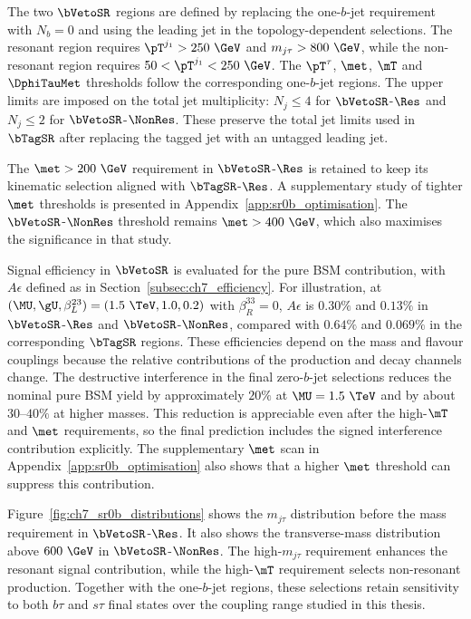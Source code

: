 The two $\bVetoSR$ regions are defined by replacing the one-$b$-jet requirement with $N_b=0$ and using the leading jet in the topology-dependent selections.
The resonant region requires $\pT^{j_1}>250~\GeV$ and $m_{j\tau}>800~\GeV$, while the non-resonant region requires $50<\pT^{j_1}<250~\GeV$.
The $\pT^\tau$, $\met$, $\mT$ and $\DphiTauMet$ thresholds follow the corresponding one-$b$-jet regions.
The upper limits are imposed on the total jet multiplicity: $N_j\leq4$ for $\bVetoSR$-$\Res$ and $N_j\leq2$ for $\bVetoSR$-$\NonRes$.
These preserve the total jet limits used in $\bTagSR$ after replacing the tagged jet with an untagged leading jet.

The $\met>200~\GeV$ requirement in $\bVetoSR$-$\Res$ is retained to keep its kinematic selection aligned with $\bTagSR$-$\Res$.
A supplementary study of tighter $\met$ thresholds is presented in Appendix~\ref{app:sr0b_optimisation}.
The $\bVetoSR$-$\NonRes$ threshold remains $\met>400~\GeV$, which also maximises the significance in that study.

Signal efficiency in $\bVetoSR$ is evaluated for the pure BSM contribution, with $A\epsilon$ defined as in Section~\ref{subsec:ch7_efficiency}.
For illustration, at $(\MU,\gU,\beta_L^{23})=(1.5~\TeV,1.0,0.2)$ with $\beta_R^{33}=0$, $A\epsilon$ is $0.30\%$ and $0.13\%$ in $\bVetoSR$-$\Res$ and $\bVetoSR$-$\NonRes$, compared with $0.64\%$ and $0.069\%$ in the corresponding $\bTagSR$ regions.
These efficiencies depend on the mass and flavour couplings because the relative contributions of the production and decay channels change.
The destructive interference in the final zero-$b$-jet selections reduces the nominal pure BSM yield by approximately $20\%$ at $\MU=1.5~\TeV$ and by about $30$--$40\%$ at higher masses.
This reduction is appreciable even after the high-$\mT$ and $\met$ requirements, so the final prediction includes the signed interference contribution explicitly.
The supplementary $\met$ scan in Appendix~\ref{app:sr0b_optimisation} also shows that a higher $\met$ threshold can suppress this contribution.

Figure~\ref{fig:ch7_sr0b_distributions} shows the $m_{j\tau}$ distribution before the mass requirement in $\bVetoSR$-$\Res$.
It also shows the transverse-mass distribution above $600~\GeV$ in $\bVetoSR$-$\NonRes$.
The high-$m_{j\tau}$ requirement enhances the resonant signal contribution, while the high-$\mT$ requirement selects non-resonant production.
Together with the one-$b$-jet regions, these selections retain sensitivity to both $b\tau$ and $s\tau$ final states over the coupling range studied in this thesis.

